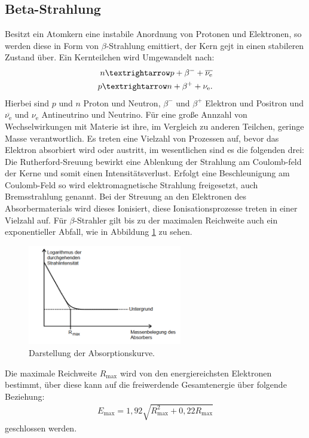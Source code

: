 \subsection{Beta-Strahlung}
Besitzt ein Atomkern eine instabile Anordnung von Protonen und Elektronen, so werden diese in Form von $\beta$-Strahlung
emittiert, der Kern gejt in einen stabileren Zustand über. Ein Kernteilchen wird Umgewandelt nach:
\begin{align}
n \textrightarrow p+\beta^- +\overline{\nu_\mathrm{e}}\\
p \textrightarrow n+\beta^+ +\nu_\mathrm{e}.
\end{align}
Hierbei sind $p$ und $n$ Proton und Neutron, $\beta^-$ und $\beta^+$ Elektron und Positron und $\overline{\nu_\mathrm{e}}$ und $\nu_\mathrm{e}$ Antineutrino und Neutrino.
Für eine große Annzahl von Wechselwirkungen mit Materie ist ihre, im Vergleich zu anderen Teilchen, geringe Masse verantwortlich.
Es treten eine Vielzahl von Prozessen auf, bevor das Elektron absorbiert wird oder austritt, im wesentlichen
sind es die folgenden drei: Die Rutherford-Sreuung bewirkt eine Ablenkung der Strahlung am Coulomb-feld der Kerne
und somit einen Intensitätsverlust. Erfolgt eine Beschleunigung am Coulomb-Feld so wird elektromagnetische
Strahlung freigesetzt, auch Bremsstrahlung genannt. Bei der Streuung an den Elektronen des Absorbermaterials
wird dieses Ionisiert, diese Ionisationsprozesse treten in einer Vielzahl auf.
Für $\beta$-Strahler gilt bis zu der maximalen Reichweite auch ein exponentieller Abfall, wie in Abbildung \ref{fig:abf}
zu sehen.
\begin{figure}
  \centering
  \includegraphics[width=0.6\textwidth]{abf.PNG}
  \caption{Darstellung der Absorptionskurve.\cite{sample}}
  \label{fig:abf}
\end{figure}
Die maximale Reichweite $R_\mathrm{max}$ wird von den energiereichsten Elektronen bestimmt, über diese kann
auf die freiwerdende Gesamtenergie über folgende Beziehung:
\begin{align}
E_\mathrm{max}=1,92\sqrt{R^2_\mathrm{max}+0,22R_\mathrm{max}}\label{eqn:emax}
\end{align}
geschlossen werden.
